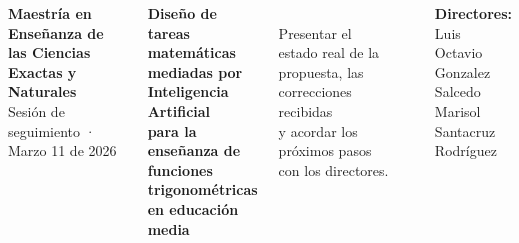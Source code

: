 \documentclass[11pt, aspectratio=169, spanish]{beamer}
\newcommand{\kwT}[1]{{\setlength{\fboxsep}{1.8pt}\colorbox{AzulInfo!18}{#1}}}        %
\newcommand{\kwM}[1]{{\setlength{\fboxsep}{1.8pt}\colorbox{VerdeUNAL!18}{#1}}}       %
\newcommand{\kwI}[1]{{\setlength{\fboxsep}{1.8pt}\colorbox{MoradoMarco!18}{#1}}}     %
\newcommand{\kwE}[1]{{\setlength{\fboxsep}{1.8pt}\colorbox{AmarilloAv!24}{#1}}}      %
\begin{document}
{
\begin{frame}[plain, shrink=5]
\vspace{0.04cm}
\begin{columns}[T]

\begin{center}
{\scriptsize\textbf{\textcolor{VerdeUNAL}{Maestría en Enseñanza de las Ciencias Exactas y Naturales}}}\\[0.04cm]
{\tiny\textcolor{VerdeUNAL}{Sesión de seguimiento · Marzo 11 de 2026}}
\end{center}

\vspace{0.15cm}

\begin{tcolorbox}[colback=VerdeUNAL!5, colframe=VerdeUNAL!80, boxrule=1.2pt, arc=3mm]
\begin{center}
{\large\textbf{\kwT{Diseño de tareas matemáticas}}}\\[0.04cm]
{\large\textbf{mediadas por \kwI{Inteligencia Artificial}}}\\[0.04cm]
{\small\textbf{para la enseñanza de \kwM{funciones trigonométricas}}}\\[0.02cm]
{\small\textbf{en \kwE{educación media}}}
\end{center}
\end{tcolorbox}

\vspace{0.15cm}

\begin{tcolorbox}[colback=AzulInfo!7, colframe=AzulInfo!50, arc=2mm, boxrule=0.8pt]
\\[0.05cm]
{\footnotesize Presentar el estado real de la propuesta, las correcciones recibidas\\
y acordar los próximos pasos con los directores.}
\end{tcolorbox}

\vspace{0.1cm}
\begin{alertblock}{}
\end{alertblock}

\vspace{0.2cm}
\begin{tcolorbox}[colback=VerdeUNAL!8, colframe=VerdeUNAL!90, boxrule=1.2pt, arc=3mm,
  title={\centering\footnotesize\textbf{\faUsers\quad Información académica}}]
{\footnotesize
\textbf{Directores:}\\[-0.02cm]
{\scriptsize\faUser\; Luis Octavio Gonzalez Salcedo }\\
{\scriptsize\faUser\; Marisol Santacruz Rodríguez}}


\end{tcolorbox}
\end{columns}
\end{frame}}
\end{document}
